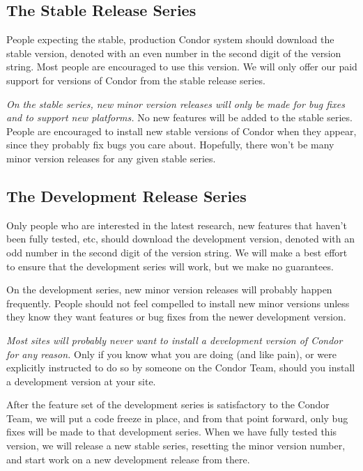 \subsection{\label{sec:Stable-Series}The Stable Release Series}

People expecting the stable, production Condor system should download
the stable version, denoted with an even number in the second digit of
the version string.
Most people are encouraged to use this version.  
We will only offer our paid support for versions of Condor from the
stable release series.

\emph{On the stable series, new minor version releases will only
be made for bug fixes and to support new platforms.}
No new features will be added to the stable series.
People are encouraged to install new stable versions of Condor when
they appear, since they probably fix bugs you care about.
Hopefully, there won't be many minor version releases for any given
stable series.


\subsection{\label{sec:Developement-Series}
The Development Release Series}

Only people who are interested in the latest research, new features
that haven't been fully tested, etc, should download the development
version, denoted with an odd number in the second digit of the version
string.  
We will make a best effort to ensure that the development series will
work, but we make no guarantees.

On the development series, new minor version releases will probably
happen frequently.
People should not feel compelled to install new minor versions unless
they know they want features or bug fixes from the newer development
version.

\emph{Most sites will probably never want to install a development
version of Condor for any reason.}
Only if you know what you are doing (and like pain), or were
explicitly instructed to do so by someone on the Condor Team, should
you install a development version at your site.

After the feature set of the development series is satisfactory to the
Condor Team, we will put a code freeze in place, and from that point
forward, only bug fixes will be made to that development series.
When we have fully tested this version, we will release a new stable
series, resetting the minor version number, and start work on a new
development release from there.

